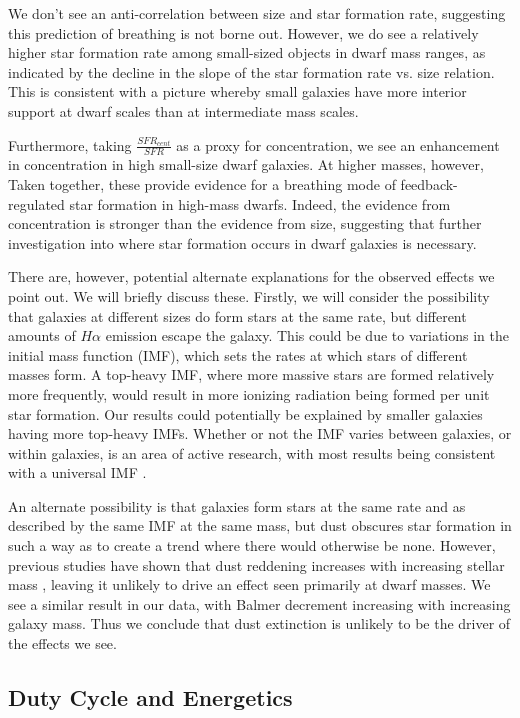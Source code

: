 \documentclass[iop]{emulateapj}
\begin{document}
We don't see an anti-correlation between size and star formation rate, suggesting this prediction of breathing is not borne out. However, we do see a relatively higher star formation rate among small-sized objects in dwarf mass ranges, as indicated by the decline in the slope of the star formation rate vs. size relation. This is consistent with a picture whereby small galaxies have more interior support at dwarf scales than at intermediate mass scales.

 Furthermore, taking $\frac{SFR_{cent}}{SFR}$ as a proxy for concentration, we see an enhancement in concentration in high small-size dwarf galaxies. At higher masses, however,  Taken together, these provide evidence for a breathing mode of feedback-regulated star formation in high-mass dwarfs. Indeed, the evidence from concentration is stronger than the evidence from size, suggesting that further investigation into where star formation occurs in dwarf galaxies is necessary.

There are, however, potential alternate explanations for the observed effects we point out. We will briefly discuss these. Firstly, we will consider the possibility that galaxies at different sizes do form stars at the same rate, but different amounts of $H\alpha$ emission escape the galaxy. This could be due to variations in the initial mass function (IMF), which sets the rates at which stars of different masses form. A top-heavy IMF, where more massive stars are formed relatively more frequently, would result in more ionizing radiation being formed per unit star formation. Our results could potentially be explained by smaller galaxies having more top-heavy IMFs. Whether or not the IMF varies between galaxies, or within galaxies, is an area of active research, with most results being consistent with a universal IMF \citep[e.g.,][]{Lee09,Bastian10}. 

An alternate possibility is that galaxies form stars at the same rate and as described by the same IMF at the same mass, but dust obscures star formation in such a way as to create a trend where there would otherwise be none. However, previous studies have shown that dust reddening increases with increasing stellar mass \citep{Garn10}, leaving it unlikely to drive an effect seen primarily at dwarf masses. We see a similar result in our data, with Balmer decrement increasing with increasing galaxy mass. Thus we conclude that dust extinction is unlikely to be the driver of the effects we see.

\subsection{Duty Cycle and Energetics}
\end{document}
